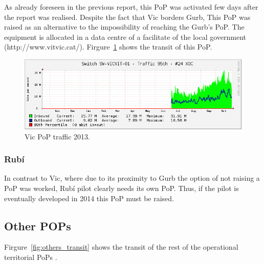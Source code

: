 As already foreseen in the previous report, this PoP was activated few days after the report was realised. Despite the fact that Vic borders Gurb, This PoP was raised as an alternative to the impossibility of reaching the Gurb's PoP. The equipment is allocated in a data centre of a facilitate of the local government (http://www.vitvic.cat/). Firgure~\ref{fig:vic_transit} shows the transit of this PoP.

\begin{figure}[H]
  \centering
  \includegraphics[width=0.95\linewidth]{sect3/figures/vic.png} 
  \caption[Vic PoP traffic 2013]{Vic PoP traffic 2013.}
  \label{fig:vic_transit}
\end{figure}


\FloatBarrier
\subsubsection{Rub\'{i}}
\label{pop_rubi}

In contrast to Vic, where due to its proximity to Gurb the option of not raising a PoP was worked, Rubí pilot clearly needs its own PoP. Thus, if the pilot is eventually developed in 2014 this PoP must be raised.


\FloatBarrier
\subsection{Other POPs}
\label{pop_others}

Firgure~\ref{fig:others_transit} shows the transit of the rest of the operational territorial PoPs .


